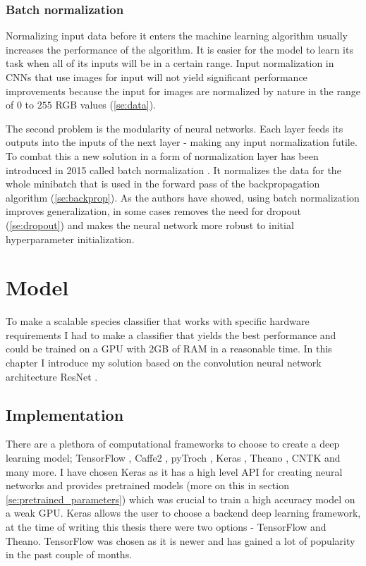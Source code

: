 \documentclass[times, utf8, diplomski]{fer}
\begin{document}
\subsection{Batch normalization}
\label{se:batch_norm}

Normalizing input data before it enters the machine learning algorithm usually increases the performance of the algorithm. It is easier for the model to learn its task when all of its inputs will be in a certain range. Input normalization in CNNs that use images for input will not yield significant performance improvements because the input for images are normalized by nature in the range of $0$ to $255$ RGB values (\ref{se:data}). 

The second problem is the modularity of neural networks. Each layer feeds its outputs into the inputs of the next layer - making any input normalization futile. To combat this a new solution in a form of normalization layer has been introduced in 2015 called batch normalization \citep{ioffe_batch_2015}. It normalizes the data for the whole minibatch that is used in the forward pass of the backpropagation algorithm (\ref{se:backprop}). As the authors have showed, using batch normalization improves generalization, in some cases removes the need for dropout (\ref{se:dropout}) and makes the neural network more robust to initial hyperparameter initialization.

\chapter{Model}
\label{se:model}
To make a scalable species classifier that works with specific hardware requirements I had to make a classifier that yields the best performance and could be trained on a GPU with 2GB of RAM in a reasonable time. In this chapter I introduce my solution based on the convolution neural network architecture ResNet \citep{he_deep_2016}.


\section{Implementation}

There are a plethora of computational frameworks to choose to create a deep learning model; TensorFlow \citep{tensorflow}, Caffe2 \citep{caffe}, pyTroch \citep{pytorch}, Keras \citep{keras}, Theano \citep{theano}, CNTK \citep{cntk} and many more. I have chosen Keras as it has a high level API for creating neural networks and provides pretrained models (more on this in section \ref{se:pretrained_parameters}) which was crucial to train a high accuracy model on a weak GPU. Keras allows the user to choose a backend deep learning framework, at the time of writing this thesis there were two options - TensorFlow and Theano. TensorFlow was chosen as it is newer and has gained a lot of popularity in the past couple of months.
\end{document}
